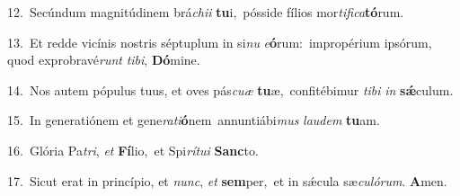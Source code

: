 {\numbfont\textcolor{\numbcolor}{12.}}~Secúndum magnitúdinem brá\-\textit{chi}\-\textit{i} \textbf{tu}\-i,~\star pósside fílios mor\-\textit{ti}\-\textit{fi}\textit{ca}\textbf{tó}rum.\par
{\numbfont\textcolor{\numbcolor}{13.}}~Et redde vicínis nostris séptuplum in si\textit{nu} \textit{e}\-\textbf{ó}rum:~\star impropérium ipsórum, quod exprobravé\textit{runt} \textit{ti}\-\textit{bi}, \textbf{Dó}\-mine.\par
{\numbfont\textcolor{\numbcolor}{14.}}~Nos autem pópulus tuus, et oves pás\-\textit{cu}\-\textit{æ} \textbf{tu}\-æ,~\star confitébimur \textit{ti}\-\textit{bi} \textit{in} \textbf{sǽ}\-culum.\par
{\numbfont\textcolor{\numbcolor}{15.}}~In generatiónem et gene\-\textit{ra}\-\textit{ti}\textbf{ó}nem~\star annuntiábi\textit{mus} \textit{lau}\-\textit{dem} \textbf{tu}\-am.\par
{\numbfont\textcolor{\numbcolor}{16.}}~Glória Pa\-\textit{tri}\-, \textit{et} \textbf{Fí}\-lio,~\star et Spi\-\textit{rí}\-\textit{tu}\textit{i} \textbf{Sanc}\-to.\par
{\numbfont\textcolor{\numbcolor}{17.}}~Sicut erat in princípio, et \textit{nunc}\-, \textit{et} \textbf{sem}\-per,~\star et in sǽcula sæ\-\textit{cu}\-\textit{ló}\textit{rum}. \textbf{A}\-men.\par

